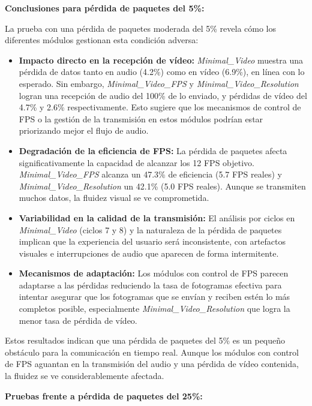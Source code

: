 \vspace{\baselineskip}

\textbf{Conclusiones para pérdida de paquetes del 5\%:}

La prueba con una pérdida de paquetes moderada del 5\% revela cómo los diferentes módulos gestionan esta condición adversa:

\begin{itemize}
\item \textbf{Impacto directo en la recepción de vídeo:} \textit{Minimal\_Video} muestra una pérdida de datos tanto en audio (4.2\%) como en vídeo (6.9\%), en línea con lo esperado. Sin embargo, \textit{Minimal\_Video\_FPS} y \textit{Minimal\_Video\_Resolution} logran una recepción de audio del 100\% de lo enviado, y pérdidas de vídeo del 4.7\% y 2.6\% respectivamente. Esto sugiere que los mecanismos de control de FPS o la gestión de la transmisión en estos módulos podrían estar priorizando mejor el flujo de audio.
\item \textbf{Degradación de la eficiencia de FPS:} La pérdida de paquetes afecta significativamente la capacidad de alcanzar los 12 FPS objetivo. \textit{Minimal\_Video\_FPS} alcanza un 47.3\% de eficiencia (5.7 FPS reales) y \textit{Minimal\_Video\_Resolution} un 42.1\% (5.0 FPS reales). Aunque se transmiten muchos datos, la fluidez visual se ve comprometida.
\item \textbf{Variabilidad en la calidad de la transmisión:} El análisis por ciclos en \textit{Minimal\_Video} (ciclos 7 y 8) y la naturaleza de la pérdida de paquetes implican que la experiencia del usuario será inconsistente, con artefactos visuales e interrupciones de audio que aparecen de forma intermitente.
\item \textbf{Mecanismos de adaptación:} Los módulos con control de FPS parecen adaptarse a las pérdidas reduciendo la tasa de fotogramas efectiva para intentar asegurar que los fotogramas que se envían y reciben estén lo más completos posible, especialmente \textit{Minimal\_Video\_Resolution} que logra la menor tasa de pérdida de vídeo.
\end{itemize}

Estos resultados indican que una pérdida de paquetes del 5\% es un pequeño obstáculo para la comunicación en tiempo real. Aunque los módulos con control de FPS aguantan en la transmisión del audio y una pérdida de vídeo contenida, la fluidez se ve considerablemente afectada.
\newpage

\textbf{Pruebas frente a pérdida de paquetes del 25\%:}
\vspace{\baselineskip}

